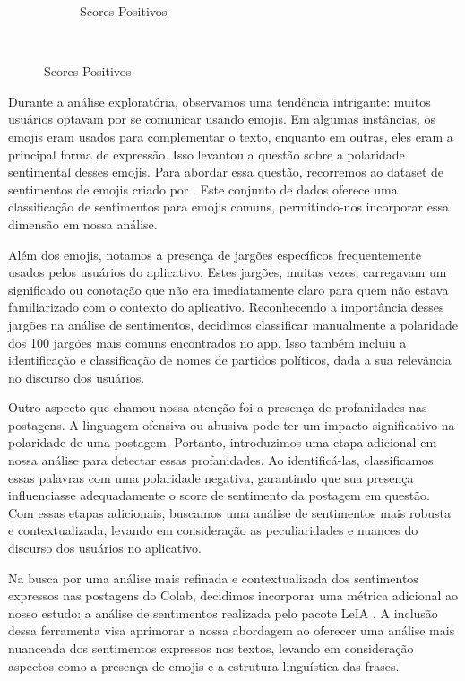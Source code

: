 \begin{figure}[htb]
\begin{subfigure}[b]{0.317\textwidth}
		\caption{Scores Positivos} \label{fig:leao}
	\end{subfigure} ~ %
	\fautor
\end{figure}

Durante a análise exploratória, observamos uma tendência intrigante: muitos usuários optavam por se comunicar usando emojis. Em algumas instâncias, os emojis eram usados para complementar o texto, enquanto em outras, eles eram a principal forma de expressão. Isso levantou a questão sobre a polaridade sentimental desses emojis. Para abordar essa questão, recorremos ao dataset de sentimentos de emojis criado por . Este conjunto de dados oferece uma classificação de sentimentos para emojis comuns, permitindo-nos incorporar essa dimensão em nossa análise.

Além dos emojis, notamos a presença de jargões específicos frequentemente usados pelos usuários do aplicativo. Estes jargões, muitas vezes, carregavam um significado ou conotação que não era imediatamente claro para quem não estava familiarizado com o contexto do aplicativo. Reconhecendo a importância desses jargões na análise de sentimentos, decidimos classificar manualmente a polaridade dos 100 jargões mais comuns encontrados no app. Isso também incluiu a identificação e classificação de nomes de partidos políticos, dada a sua relevância no discurso dos usuários.

Outro aspecto que chamou nossa atenção foi a presença de profanidades nas postagens. A linguagem ofensiva ou abusiva pode ter um impacto significativo na polaridade de uma postagem. Portanto, introduzimos uma etapa adicional em nossa análise para detectar essas profanidades. Ao identificá-las, classificamos essas palavras com uma polaridade negativa, garantindo que sua presença influenciasse adequadamente o score de sentimento da postagem em questão. Com essas etapas adicionais, buscamos uma análise de sentimentos mais robusta e contextualizada, levando em consideração as peculiaridades e nuances do discurso dos usuários no aplicativo.

Na busca por uma análise mais refinada e contextualizada dos sentimentos expressos nas postagens do Colab, decidimos incorporar uma métrica adicional ao nosso estudo: a análise de sentimentos realizada pelo pacote LeIA \cite{2018_Almeida_PAGE}. A inclusão dessa ferramenta visa aprimorar a nossa abordagem ao oferecer uma análise mais nuanceada dos sentimentos expressos nos textos, levando em consideração aspectos como a presença de emojis e a estrutura linguística das frases.

